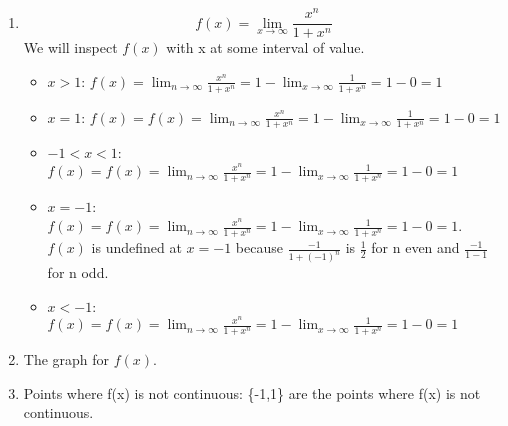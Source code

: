 \begin{numedquestion}
\begin{enumerate}[label={(\arabic*)}]
    \setcounter{enumi}{0}

    \item  \[f(x) = \lim_{x \rightarrow \infty} \frac{x^n}{1 + x^n}\]
    We will inspect $f(x)$ with x at some interval of value. 
    \begin{itemize}
      \item $x >1$: $f(x) = \lim_{n\rightarrow \infty} \frac{x^n}{1 +x^n} = 1 - \lim_{x\rightarrow\infty} \frac{1}{1+x^n} =1 -0 = 1$
      \item $x = 1$: $f(x) = f(x) = \lim_{n\rightarrow \infty} \frac{x^n}{1 +x^n} = 1 - \lim_{x\rightarrow\infty} \frac{1}{1+x^n} =1 -0 = 1$
      \item $-1 < x < 1$: $f(x) = f(x) = \lim_{n\rightarrow \infty} \frac{x^n}{1 +x^n} = 1 - \lim_{x\rightarrow\infty} \frac{1}{1+x^n} =1 -0 = 1$
      \item $x = -1$: $f(x) = f(x) = \lim_{n\rightarrow \infty} \frac{x^n}{1 +x^n} = 1 - \lim_{x\rightarrow\infty} \frac{1}{1+x^n} =1 -0 = 1$. $f(x)$ is undefined at $x = - 1$ because $\frac{-1}{1+(-1)^n}$ is $\frac{1}{2}$ for n even and $\frac{-1}{1-1}$ for n odd. 
      \item $x < -1$: $f(x) = f(x) = \lim_{n\rightarrow \infty} \frac{x^n}{1 +x^n} = 1 - \lim_{x\rightarrow\infty} \frac{1}{1+x^n} =1 -0 = 1$
    
    \end{itemize}
    \item  The graph for $f(x)$. \newline

    \item Points where f(x) is not continuous: \{-1,1\} are the points where f(x) is not continuous. 
\end{enumerate}
\end{numedquestion}
  

